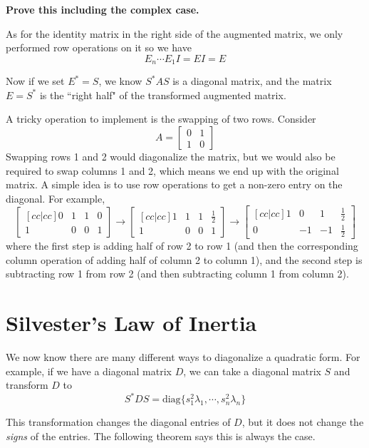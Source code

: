 \textbf{Prove this including the complex case. }

As for the identity matrix in the right side of the augmented matrix, we only performed row operations on it so we have 
$$E_{n} \cdots E_{1} I = EI = E$$

Now if we set $E^{*} = S$, we know $S^{*}AS$ is a diagonal matrix, and the matrix $E = S^{*}$ is the ``right half" of the transformed augmented matrix. 

A tricky operation to implement is the swapping of two rows. Consider 
$$A = \begin{bmatrix}
0 & 1 \\
1 & 0
\end{bmatrix}$$
Swapping rows 1 and 2 would diagonalize the matrix, but we would also be required to swap columns 1 and 2, which means we end up with the original matrix. A simple idea is to use row operations to get a non-zero entry on the diagonal. For example, 
$$\begin{bmatrix}[cc|cc]
0 & 1 & 1 & 0 \\
1 & 0 & 0 & 1
\end{bmatrix} \rightarrow \begin{bmatrix}[cc|cc] 
1 & 1 & 1 & \frac{1}{2} \\
1 & 0 & 0 & 1
\end{bmatrix} \rightarrow \begin{bmatrix}[cc|cc] 
1 & 0 & 1 & \frac{1}{2} \\
0 & -1 & -1 & \frac{1}{2}
\end{bmatrix}
$$
where the first step is adding half of row 2 to row 1 (and then the corresponding column operation of adding half of column 2 to column 1), and the second step is subtracting row 1 from row 2 (and then subtracting column 1 from column 2). 

\section{Silvester's Law of Inertia} 

We now know there are many different ways to diagonalize a quadratic form. For example, if we have a diagonal matrix $D$, we can take a diagonal matrix $S$ and transform $D$ to 
$$S^{*} DS = \text{diag}\{ s_{1}^{2} \lambda_{1}, \cdots, s_{n}^{2} \lambda_{n} \}$$

This transformation changes the diagonal entries of $D$, but it does not change the \textit{signs} of the entries. The following theorem says this is always the case. 

